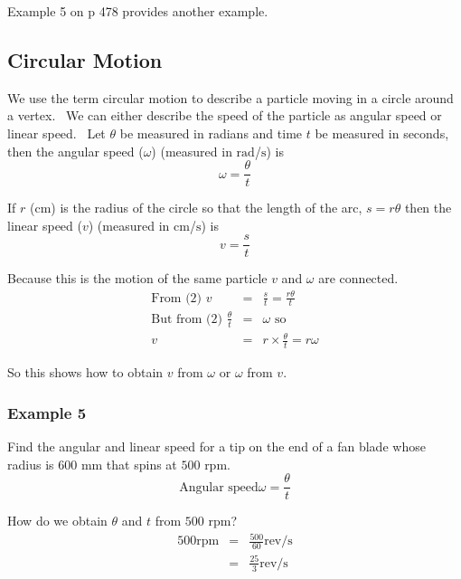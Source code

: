 Example 5 on p 478 provides another example. 

\subsection{Circular Motion}
We use the term circular motion to describe a particle moving in a circle around a vertex. \ We can
either describe the speed of the particle as angular speed or linear speed. \ Let $\theta $ be measured in radians and time $t$ be measured in seconds, then the angular speed ($\omega $) (measured in $\mbox{rad}$/$\mbox{s}$) is
\begin{equation}\omega  =\frac{\theta }{t}\tag{1}
\end{equation}

If $r$ ($\mbox{cm}$) is the radius of the circle so that the length of the arc, $s =r \theta $ then the linear speed ($v$) (measured in $\mbox{cm}$/$\mbox{s}$) is
\begin{equation}v =\frac{s}{t}\tag{2}
\end{equation}

Because this is the motion of the same particle $v$ and $\omega $ are connected.
\begin{align}\text{From (2)\ \ \ \ }v &  = & \frac{s}{t} =\frac{r \theta }{t} \nonumber  \\
\text{But from (2)\ \ \ }\frac{\theta }{t} &  = & \omega \text{\ \ so} \nonumber  \\
v &  = & r \times \frac{\theta }{t} =r \omega  \tag{3}\end{align}

So this shows how to obtain $v$ from $\omega $ or $\omega $ from $v$. 

\subsubsection{Example 5}
Find the angular and linear speed for a tip on the end of a fan blade whose radius is $600$ $\mbox{mm}$ that spins at $500$ rpm.
\begin{equation*}\text{Angular speed}\omega  =\frac{\theta }{t}
\end{equation*}

How do we obtain $\theta $ and $t$ from $500$ rpm?
\begin{align*}500\text{rpm} &  = & \frac{500}{60}\text{rev/}\mbox{s} \\
 &  = & \frac{25}{3}\text{rev/}\mbox{s}\end{align*}


